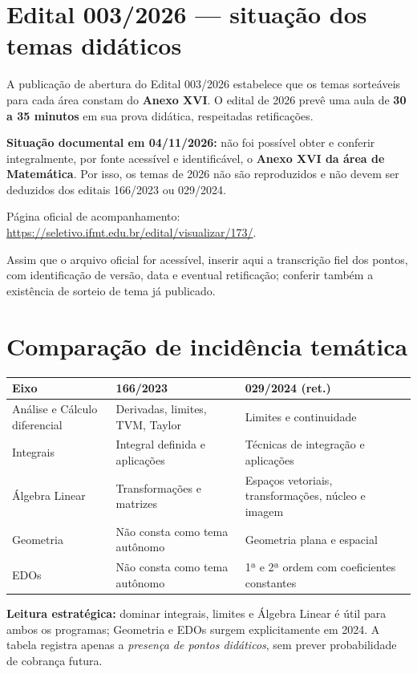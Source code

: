 \documentclass[11pt,a4paper]{article}
\begin{document}
\section{Edital 003/2026 --- situação dos temas didáticos}
A publicação de abertura do Edital 003/2026 estabelece que os temas sorteáveis para cada área constam do \textbf{Anexo XVI}. O edital de 2026 prevê uma aula de \textbf{30 a 35 minutos} em sua prova didática, respeitadas retificações.

\textbf{Situação documental em 04/11/2026:} não foi possível obter e conferir integralmente, por fonte acessível e identificável, o \textbf{Anexo XVI da área de Matemática}. Por isso, os temas de 2026 não são reproduzidos e não devem ser deduzidos dos editais 166/2023 ou 029/2024.

Página oficial de acompanhamento:
\url{https://seletivo.ifmt.edu.br/edital/visualizar/173/}.

Assim que o arquivo oficial for acessível, inserir aqui a transcrição fiel dos pontos, com identificação de versão, data e eventual retificação; conferir também a existência de sorteio de tema já publicado.

\section{Comparação de incidência temática}
\begin{longtable}{p{}p{}p{}}
\toprule
\textbf{Eixo}&\textbf{166/2023}&\textbf{029/2024 (ret.)}\\\midrule
\endhead
Análise e Cálculo diferencial & Derivadas, limites, TVM, Taylor & Limites e continuidade\\
Integrais & Integral definida e aplicações & Técnicas de integração e aplicações\\
Álgebra Linear & Transformações e matrizes & Espaços vetoriais, transformações, núcleo e imagem\\
Geometria & Não consta como tema autônomo & Geometria plana e espacial\\
EDOs & Não consta como tema autônomo & 1ª e 2ª ordem com coeficientes constantes\\
\bottomrule
\end{longtable}
\textbf{Leitura estratégica:} dominar integrais, limites e Álgebra Linear é útil para ambos os programas; Geometria e EDOs surgem explicitamente em 2024. A tabela registra apenas a \emph{presença de pontos didáticos}, sem prever probabilidade de cobrança futura.
\end{document}
